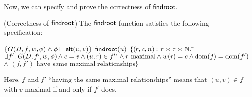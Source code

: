 Now, we can specify and prove the correctness of $\mathsf{findroot}$. 

\begin{lemma}{(Correctness of $\mathsf{findroot}$)}
The $\mathsf{findroot}$ function satisfies the following specification:
\begin{specification}
\nextline $\{G(D, f, w, \phi) \land {\phi} \vdash \mathsf{elt}({u}, {v})\}$
\nextline $\mathsf{findroot}(u)$
\nextline $\{(r,c,n):\tau \times \tau \times \mathbb{N}.$ 
\nextline\;\;\= $\exists f'.\; G(D, f', w, \phi) \land c = v \land (u,r) \in f'^{*} \land r \mbox{ maximal} \land w(r) = c \land \mbox{dom}({f}) = \mbox{dom}({f'})$
\nextline\> $\land\; (f,f')\mbox{ have same maximal relationships}\}$
\end{specification}
\end{lemma}

Here, $f$ and $f'$ ``having the same maximal relationships'' means that $(u,v) \in f^+$ with $v$ maximal
if and only if $f'$ does. 

